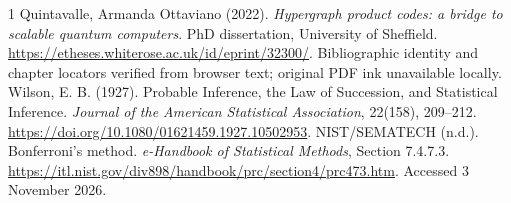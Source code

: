 \begin{thebibliography}{1}
 Quintavalle, Armanda Ottaviano (2022).
\emph{Hypergraph product codes: a bridge to scalable quantum computers}. PhD dissertation, University of Sheffield.
\url{https://etheses.whiterose.ac.uk/id/eprint/32300/}. Bibliographic identity and chapter locators verified from browser text; original PDF ink unavailable locally.
 Wilson, E. B. (1927). Probable Inference, the Law of Succession, and Statistical Inference. \emph{Journal of the American Statistical Association}, 22(158), 209--212. \url{https://doi.org/10.1080/01621459.1927.10502953}.
 NIST/SEMATECH (n.d.). Bonferroni's method. \emph{e-Handbook of Statistical Methods}, Section 7.4.7.3. \url{https://itl.nist.gov/div898/handbook/prc/section4/prc473.htm}. Accessed 3 November 2026.
\end{thebibliography}
